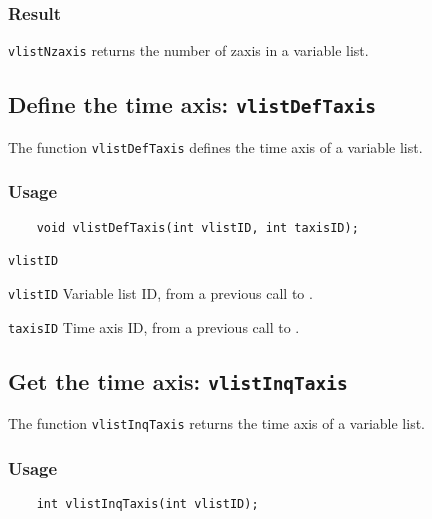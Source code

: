 \subsubsection*{Result}

{\texttt{vlistNzaxis}} returns the number of zaxis in a variable list.



\subsection{Define the time axis: \texttt{vlistDefTaxis}}
\label{vlistDefTaxis}

The function {\texttt{vlistDefTaxis}} defines the time axis of a variable list.

\subsubsection*{Usage}

\begin{verbatim}
    void vlistDefTaxis(int vlistID, int taxisID);
\end{verbatim}

\hspace*{4mm}\begin{minipage}[]{15cm}
\begin{deflist}{\texttt{vlistID}\ }
\item[\texttt{vlistID}]
Variable list ID, from a previous call to {}.
\item[\texttt{taxisID}]
Time axis ID, from a previous call to {}.

\end{deflist}
\end{minipage}


\subsection{Get the time axis: \texttt{vlistInqTaxis}}
\label{vlistInqTaxis}

The function {\texttt{vlistInqTaxis}} returns the time axis of a variable list.

\subsubsection*{Usage}

\begin{verbatim}
    int vlistInqTaxis(int vlistID);
\end{verbatim}

